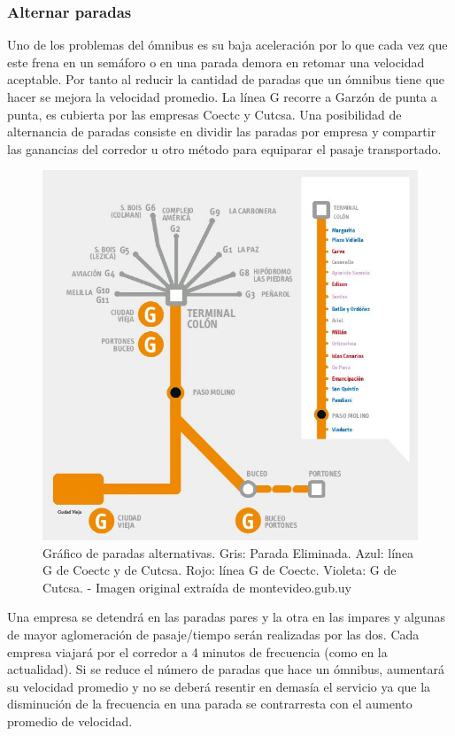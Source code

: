 \subsubsection{Alternar paradas}

Uno de los problemas del ómnibus es su baja aceleración por lo que cada vez que este frena en un semáforo o en una parada demora en retomar una velocidad aceptable. Por tanto al reducir la cantidad de paradas que un ómnibus tiene que hacer se mejora la velocidad promedio.
La línea G recorre a Garzón de punta a punta, es cubierta por las empresas Coectc y Cutcsa. Una posibilidad de alternancia de paradas consiste en dividir las paradas por empresa y compartir las ganancias del corredor u otro método para equiparar el pasaje transportado. 

\begin{figure}[H]
	\centering
	\includegraphics[width=0.9\linewidth]{Figures/paradas_alternativas}
	\caption{Gráfico de paradas alternativas. Gris: Parada Eliminada. Azul: línea G de Coectc y de Cutcsa. Rojo: línea G de Coectc. Violeta: G de Cutcsa. - Imagen original extraída de montevideo.gub.uy}
	\label{fig:paradas_alternadas}
\end{figure}

Una empresa se detendrá en las paradas pares y la otra en las impares y algunas de mayor aglomeración de pasaje/tiempo serán realizadas por las dos. Cada empresa viajará por el corredor a 4 minutos de frecuencia (como en la actualidad). Si se reduce el número de paradas que hace un ómnibus, aumentará su velocidad promedio y no se deberá resentir en demasía el servicio ya que la disminución de la frecuencia en una parada se contrarresta con el aumento promedio de velocidad.


